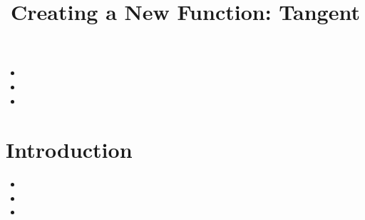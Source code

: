\documentclass{ximera}
\author{}
\title{Creating a New Function: Tangent}
\begin{document}
\begin{abstract}
  
\end{abstract}
\maketitle



\begin{motivatingQuestions}\begin{itemize}
\item 
\item 
\item 
\end{itemize}\end{motivatingQuestions}



\section{Introduction}






\begin{summary}\begin{itemize}
\item 
\item 
\item
\end{itemize}\end{summary}
\end{document}
